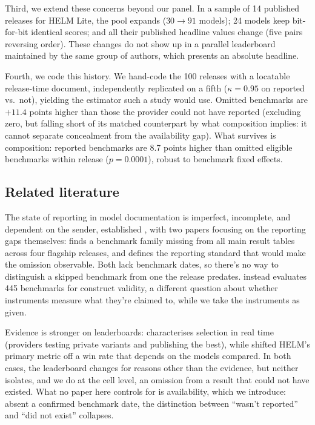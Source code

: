 \documentclass{article}
\begin{document}
Third, we extend these concerns beyond our panel. In a sample of 14 published releases for HELM Lite, the pool expands ($30 \to 91$ models); 24 models keep bit-for-bit identical scores; and all their published headline values change (five pairs reversing order). These changes do not show up in a parallel leaderboard maintained by the same group of authors, which presents an absolute headline.

Fourth, we code this history. We hand-code the 100 releases with a locatable release-time document, independently replicated on a fifth ($\kappa = 0.95$ on reported vs.\ not), yielding the estimator such a study would use. Omitted benchmarks are $+11.4$ points higher than those the provider could not have reported (excluding zero, but falling short of its matched counterpart by what composition implies: it cannot separate concealment from the availability gap). What survives is composition: reported benchmarks are 8.7 points higher than omitted eligible benchmarks within release ($p = 0.0001$), robust to benchmark fixed effects.

\subsection{Related literature}\label{sec:related}

The state of reporting in model documentation is imperfect, incomplete, and dependent on the sender, established \citep{staufer2025auditcards,kuehnert2026disclosure}, with two papers focusing on the reporting gaps themselves: \citet{zhang2026positional} finds a benchmark family missing from all main result tables across four flagship releases, and \citet{ghosh2026evalcards} defines the reporting standard that would make the omission observable. Both lack benchmark dates, so there's no way to distinguish a skipped benchmark from one the release predates. \citet{bean2025measuring} instead evaluates 445 benchmarks for construct validity, a different question about whether instruments measure what they're claimed to, while we take the instruments as given.

Evidence is stronger on leaderboards: \citet{singh2025leaderboard} characterises selection in real time (providers testing private variants and publishing the best), while \citet{xu2025capabilities} shifted HELM's primary metric off a win rate that depends on the models compared. In both cases, the leaderboard changes for reasons other than the evidence, but neither isolates, and we do at the cell level, an omission from a result that could not have existed. What no paper here controls for is availability, which we introduce: absent a confirmed benchmark date, the distinction between ``wasn't reported'' and ``did not exist'' collapses.
\end{document}
